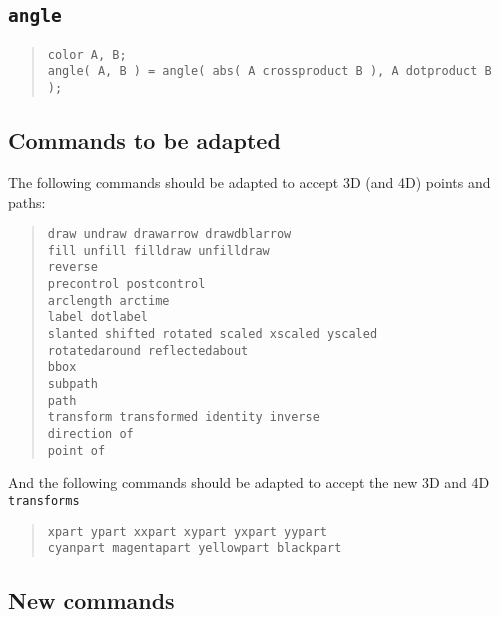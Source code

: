 \documentclass{article}
\begin{document}
\subsection{\tt angle}

\begin{quote}
\begin{verbatim}
color A, B;
angle( A, B ) = angle( abs( A crossproduct B ), A dotproduct B );
\end{verbatim}
\end{quote}

\subsection{Commands to be adapted}

The following commands should be adapted to accept 3D (and 4D) points and
paths:
\begin{quote}
\begin{verbatim}
draw undraw drawarrow drawdblarrow
fill unfill filldraw unfilldraw
reverse
precontrol postcontrol
arclength arctime
label dotlabel
slanted shifted rotated scaled xscaled yscaled 
rotatedaround reflectedabout
bbox
subpath
path
transform transformed identity inverse
direction of
point of
\end{verbatim}
\end{quote}
And the following commands should be adapted to accept the new 3D and
4D {\tt transforms}
\begin{quote}
\begin{verbatim}
xpart ypart xxpart xypart yxpart yypart
cyanpart magentapart yellowpart blackpart
\end{verbatim}
\end{quote}

\subsection{New commands}
\end{document}
